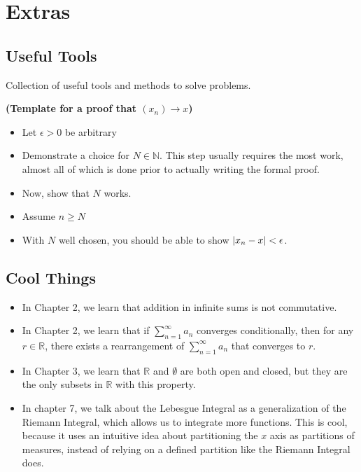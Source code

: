 \appendix
\chapter{Extras}
\section{Useful Tools}

Collection of useful tools and methods to solve problems.

\begin{tip}
  \textbf{
    (Template for a proof that $(x_n) \rightarrow x$)
  }
  \begin{itemize}
    \item Let $\epsilon > 0$ be arbitrary 
    \item Demonstrate a choice for $N \in \mathbb{N}$. 
    This step usually requires the most work, almost all of
    which is done prior to actually writing the formal proof.
    \item Now, show that $N$ works.
    \item Assume $n \geq N$
    \item With $N$ well chosen,  you should be able to show $\abs{x_n - x} < \epsilon$.
  \end{itemize}
\end{tip}

\section{Cool Things}
\begin{itemize}
  \item In Chapter 2, we learn that addition in infinite sums is not commutative.
  \item In Chapter 2, we learn that if $\sum_{n=1}^\infty a_n$ converges conditionally, then 
  for any $r \in \mathbb{R}$, there exists a rearrangement of $\sum_{n=1}^\infty a_n$ that converges to $r$.
  \item In Chapter 3, we learn that $\mathbb{R}$ and $\emptyset$ are both open and closed, 
  but they are the only subsets in $\mathbb{R}$ with this property.
  \item In chapter 7, we talk about the Lebesgue Integral as a generalization of the Riemann Integral,
  which allows us to integrate more functions. This is cool, because it uses an intuitive
  idea about partitioning the $x$ axis as partitions of measures, instead of relying on 
  a defined partition like the Riemann Integral does.
\end{itemize}

